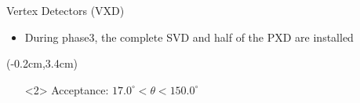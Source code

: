 \documentclass[8pt]{beamer}
\begin{document}
\begin{frame}{Vertex Detectors (VXD)}
\begin{textblock*}{5cm}
\begin{itemize}
				\item<2> During phase3, the complete SVD and half of the PXD are installed

			\end{itemize}
			\end{textblock*}
\begin{textblock*}{11cm}(-0.2cm,3.4cm)
	\begin{center}
		
	\begin{itemize}
	
	\centering
				\item[]<2> Acceptance: $17.0^{\circ} < \theta < 150.0^{\circ}$ 
	\end{itemize}

\end{center}
\end{textblock*}



	
	

	
	
	
\end{frame}
\end{document}
